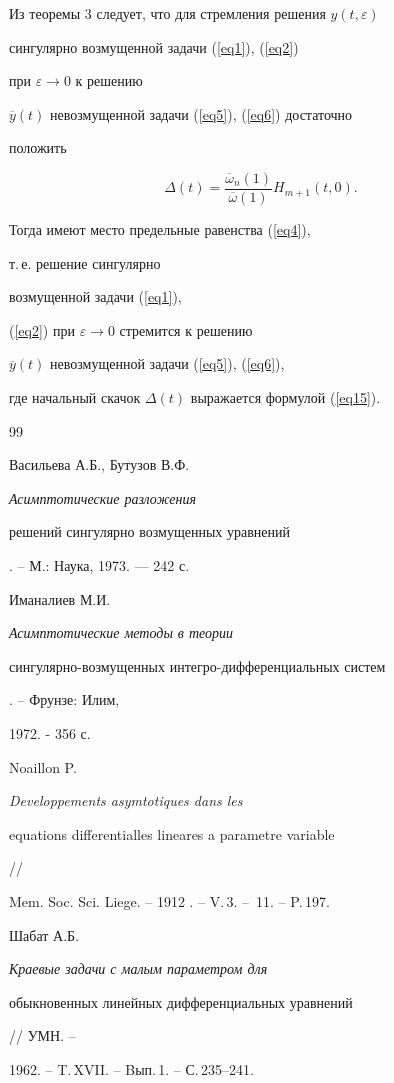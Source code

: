 Из теоремы 3 следует, что для стремления решения $y(t,\varepsilon )$ 


сингулярно возмущенной задачи (\ref{eq1}), (\ref{eq2})


при $\varepsilon \to 0$ к решению 


$\overline {y}(t)$ невозмущенной задачи (\ref{eq5}), (\ref{eq6}) достаточно 


положить


\begin{equation}


\label{eq15}


\Delta(t)=\frac{\overline{\omega}_{n}(1)}{\overline{\omega}(1)}H_{m+1}(t,0).


\end{equation}


Тогда имеют место предельные равенства (\ref{eq4}),


т.\,е. решение сингулярно 


возмущенной задачи (\ref{eq1}),


(\ref{eq2}) при $\varepsilon \to 0$ стремится к решению 


$\overline{y}(t)$ невозмущенной задачи (\ref{eq5}), (\ref{eq6}),


где начальный скачок $\Delta 


(t)$ выражается формулой (\ref{eq15}).








\begin{thebibliography}{99}





 Васильева А.Б., Бутузов В.Ф. {\em Асимптотические разложения 


решений сингулярно возмущенных уравнений}. -- М.: Наука, 1973. --- 242 с.


 Иманалиев М.И. {\em Асимптотические методы в теории


сингулярно-возмущенных интегро-дифференциальных систем}. -- Фрунзе: Илим, 


1972. - 356 с.


 Noaillon P. {\em Developpements asymtotiques dans les 


equations differentialles lineares a parametre variable} // 


Mem. Soc. Sci. Liege. -- 1912 . -- V.\,3. -- \No\,11. -- P.\,197.


 Шабат А.Б. {\em Краевые задачи с малым параметром для 


обыкновенных линейных дифференциальных уравнений} // УМН. -- 


1962. -- T.\,XVII. -- Bып.\,1. -- С.\,235--241.





\end{thebibliography}





